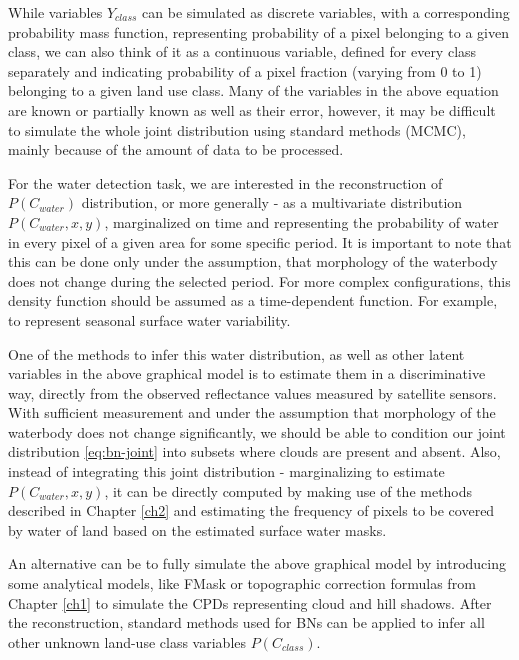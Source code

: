 While variables $Y_{class}$ can be simulated as discrete variables, with a corresponding probability mass function, representing probability of a pixel belonging to a given class, we can also think of it as a continuous variable, defined for every class separately and indicating probability of a pixel fraction (varying from 0 to 1) belonging to a given land use class. Many of the variables in the above equation are known or partially known as well as their error, however, it may be difficult to simulate the whole joint distribution using standard methods (MCMC), mainly because of the amount of data to be processed.

For the water detection task, we are interested in the reconstruction of $P(C_{water})$ distribution, or more generally - as a multivariate distribution $P(C_{water}, x, y)$, marginalized on time and representing the probability of water in every pixel of a given area for some specific period. It is important to note that this can be done only under the assumption, that morphology of the waterbody does not change during the selected period. For more complex configurations, this density function should be assumed as a time-dependent function. For example, to represent seasonal surface water variability. 

One of the methods to infer this water distribution, as well as other latent variables in the above graphical model is to estimate them in a discriminative way, directly from the observed reflectance values measured by satellite sensors. With sufficient measurement and under the assumption that morphology of the waterbody does not change significantly, we should be able to condition our joint distribution \ref{eq:bn-joint} into subsets where clouds are present and absent. Also, instead of integrating this joint distribution - marginalizing to estimate $P(C_{water}, x, y)$, it can be directly computed by making use of the methods described in Chapter \ref{ch2} and estimating the frequency of pixels to be covered by water of land based on the estimated surface water masks.

An alternative can be to fully simulate the above graphical model by introducing some analytical models, like FMask or topographic correction formulas from Chapter \ref{ch1} to simulate the CPDs representing cloud and hill shadows. After the reconstruction, standard methods used for BNs can be applied to infer all other unknown land-use class variables $P(C_{class})$.


